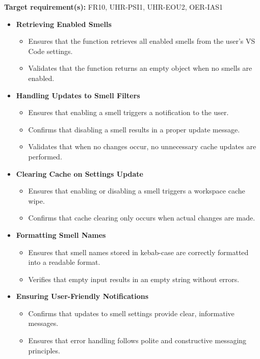 \documentclass[12pt, titlepage]{article}
\begin{document}
  \noindent \textbf{Target requirement(s):} FR10, UHR-PSI1, UHR-EOU2,
  OER-IAS1~\cite{SRS} \\

  \begin{itemize}
    \item \textbf{Retrieving Enabled Smells}
      \begin{itemize}
        \item Ensures that the function retrieves all enabled smells
          from the user's VS Code settings.
        \item Validates that the function returns an empty object
          when no smells are enabled.
      \end{itemize}

    \item \textbf{Handling Updates to Smell Filters}
      \begin{itemize}
        \item Ensures that enabling a smell triggers a notification to the user.
        \item Confirms that disabling a smell results in a proper
          update message.
        \item Validates that when no changes occur, no unnecessary
          cache updates are performed.
      \end{itemize}

    \item \textbf{Clearing Cache on Settings Update}
      \begin{itemize}
        \item Ensures that enabling or disabling a smell triggers a
          workspace cache wipe.
        \item Confirms that cache clearing only occurs when actual
          changes are made.
      \end{itemize}

    \item \textbf{Formatting Smell Names}
      \begin{itemize}
        \item Ensures that smell names stored in kebab-case are
          correctly formatted into a readable format.
        \item Verifies that empty input results in an empty string
          without errors.
      \end{itemize}

    \item \textbf{Ensuring User-Friendly Notifications}
      \begin{itemize}
        \item Confirms that updates to smell settings provide clear,
          informative messages.
        \item Ensures that error handling follows polite and
          constructive messaging principles.
      \end{itemize}
  \end{itemize}
\end{document}
